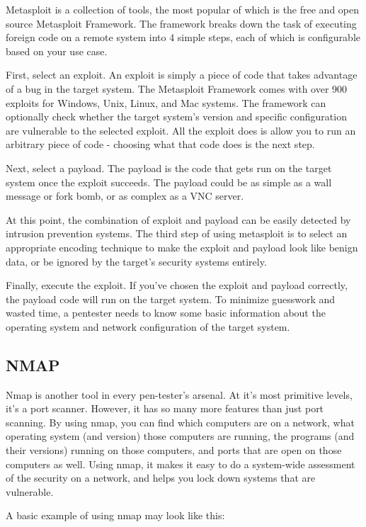 \documentclass{report}
\begin{document}
Metasploit is a collection of tools, the most popular of which is the free and
open source Metasploit Framework. The framework breaks down the task of
executing foreign code on a remote system into 4 simple steps, each of which
is configurable based on your use case. 

First, select an exploit. An exploit is simply a piece of code that takes
advantage of a bug in the target system. The Metasploit Framework comes with
over 900 exploits for Windows, Unix, Linux, and Mac systems. The framework can
optionally check whether the target system's version and specific
configuration are vulnerable to the selected exploit. All the exploit does is
allow you to run an arbitrary piece of code - choosing what that code does is
the next step.

Next, select a payload. The payload is the code that gets run on the target
system once the exploit succeeds. The payload could be as simple as a wall
message or fork bomb, or as complex as a VNC server. 

At this point, the combination of exploit and payload can be easily detected
by intrusion prevention systems. The third step of using metasploit is to
select an appropriate encoding technique to make the exploit and payload look
like benign data, or be ignored by the target's security systems entirely. 

Finally, execute the exploit. If you've chosen the exploit and payload
correctly, the payload code will run on the target system. To minimize
guesswork and wasted time, a pentester needs to know some basic information
about the operating system and network configuration of the target system. 

\subsection*{NMAP}

Nmap is another tool in every pen-tester's arsenal. At it's most primitive
levels, it's a port scanner. However, it has so many more features than just
port scanning. By using nmap, you can find which computers are on a network,
what operating system (and version) those computers are running, the programs
(and their versions) running on those computers, and ports that are open on 
those computers as well. Using nmap, it makes it easy to do a system-wide 
assessment of the security on a network, and helps you lock down systems that 
are vulnerable.

A basic example of using nmap may look like this:
\end{document}
